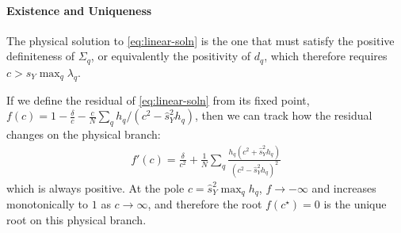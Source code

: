 \documentclass[../main.tex]{subfiles}
\begin{document}
\paragraph{Existence and Uniqueness}

The physical solution to \eqref{eq:linear-soln} is the one that must satisfy the positive definiteness of $\Sigma_q$, or equivalently the positivity of $d_q$, which therefore requires $c > \hat s_Y \max_q \lambda_q$.

If we define the residual of \eqref{eq:linear-soln} from its fixed point, $f(c) = 1 - \frac{\delta}{c} - \frac{c}{N} \sum_q h_q/(c^2 - \hat s_Y^2 h_q)$, then we can track how the residual changes on the physical branch:
\begin{align*}
    f'(c) 
    = 
    \frac{\delta}{c^2} 
    + 
    \frac{1}{N} \sum_q \frac{h_q (c^2 + \hat s_Y^2 h_q)}{(c^2 - \hat s_Y^2 h_q)^2}
\end{align*}
which is always positive. At the pole $c = \hat s_Y^2 \max_q h_q$, $f \rightarrow - \infty$ and increases monotonically to $1$ as $c \rightarrow \infty$, and therefore the root $f(c^{\star})=0$ is the unique root on this physical branch.
\end{document}
